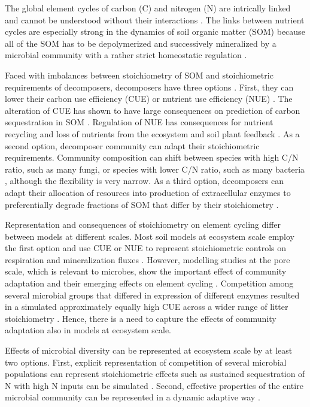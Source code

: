 
\introduction 
The global element cycles of carbon (C) and nitrogen (N) are intrically linked
and cannot be understood without their interactions 
\citep{Thornton07,Janssens10, Zaehle11}%
. 
The links between nutrient cycles are especially strong
in the dynamics of soil organic matter (SOM) because all of the SOM has to be
depolymerized and successively mineralized by a microbial community with a
rather strict homeostatic regulation \citep{Sterner02, Zechmeister15}.

Faced with imbalances between stoichiometry of SOM and stoichiometric
requirements of decomposers, decomposers have three options
\citep{Mooshammer14}.
First, they can lower their carbon use efficiency (CUE) or nutrient use
efficiency (NUE) \citep{Sinsabaugh13}. The alteration of CUE has shown to have
large consequences on prediction of carbon sequestration in SOM
\citep{Allison14a, Wieder13}.
Regulation of NUE has consequences for nutrient recycling and loss of nutrients
from the ecosystem \citep{Mooshammer14a} and soil plant feedback
\citep{Rastetter11}.
As a second option, decomposer community can adapt their stoichiometric
requirements. Community composition can shift between species with high C/N
ratio, such as many fungi, or species with lower C/N ratio, such as many
bacteria \citep{Cleveland07, Xu13}, although the flexibility is very narrow.
As a third option, decomposers can adapt their allocation of resources into
production of extracellular enzymes to preferentially degrade fractions of SOM
that differ by their stoichiometry \citep{Moorhead12}.


Representation and consequences of stoichiometry on element cycling differ
between models at different scales. Most soil models at ecosystem scale
employ the first option and use CUE or NUE to represent stoichiometric controls
on respiration and mineralization fluxes \citep{Manzoni08}. However, modelling
studies at the pore scale, which is relevant to microbes, show the
important effect of community adaptation and their emerging effects on element cycling
\citep{Allison05, Resat11, Wang13}. Competition among several
microbial groups that differed in expression of different enzymes resulted in a
simulated approximately equally high CUE across a wider range of litter
stoichiometry \citep{Kaiser14}. Hence, there is a need to capture the effects of community
adaptation also in models at ecosystem scale.

Effects of microbial diversity can be represented at ecosystem scale by
at least two options. First, explicit representation of competition of
several microbial populations can represent stoichiometric effects such as
sustained sequestration of N with high N inputs can be simulated \citep{Perveen14}.
Second, effective properties of the entire microbial community can be
represented in a dynamic adaptive way \citep{Rastetter97, Rastetter11}.

